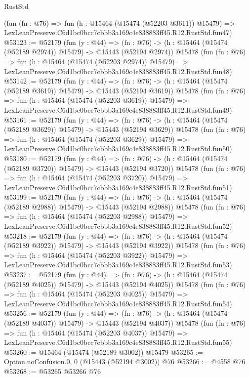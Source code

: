 \begin{lexlean}{RustStd}
\begin{coremodule}
    (fun (fn : @76) =>
    fun (h : @15464 (@15474 (@52203 @3611)) @15479) =>
    LexLeanPreserve.C6d1bc0bcc7cbbb3a169c4e838883ff45.R12.RustStd.fun47)
@53123 := @52179
    (fun (y : @44) =>
    (fn : @76) -> (h : @15464 (@15474 (@52189 @2974)) @15479) -> @15443 (@52194 @2974))
    @15478
    (fun (fn : @76) =>
    fun (h : @15464 (@15474 (@52203 @2974)) @15479) =>
    LexLeanPreserve.C6d1bc0bcc7cbbb3a169c4e838883ff45.R12.RustStd.fun48)
@53142 := @52179
    (fun (y : @44) =>
    (fn : @76) -> (h : @15464 (@15474 (@52189 @3619)) @15479) -> @15443 (@52194 @3619))
    @15478
    (fun (fn : @76) =>
    fun (h : @15464 (@15474 (@52203 @3619)) @15479) =>
    LexLeanPreserve.C6d1bc0bcc7cbbb3a169c4e838883ff45.R12.RustStd.fun49)
@53161 := @52179
    (fun (y : @44) =>
    (fn : @76) -> (h : @15464 (@15474 (@52189 @3629)) @15479) -> @15443 (@52194 @3629))
    @15478
    (fun (fn : @76) =>
    fun (h : @15464 (@15474 (@52203 @3629)) @15479) =>
    LexLeanPreserve.C6d1bc0bcc7cbbb3a169c4e838883ff45.R12.RustStd.fun50)
@53180 := @52179
    (fun (y : @44) =>
    (fn : @76) -> (h : @15464 (@15474 (@52189 @3720)) @15479) -> @15443 (@52194 @3720))
    @15478
    (fun (fn : @76) =>
    fun (h : @15464 (@15474 (@52203 @3720)) @15479) =>
    LexLeanPreserve.C6d1bc0bcc7cbbb3a169c4e838883ff45.R12.RustStd.fun51)
@53199 := @52179
    (fun (y : @44) =>
    (fn : @76) -> (h : @15464 (@15474 (@52189 @2988)) @15479) -> @15443 (@52194 @2988))
    @15478
    (fun (fn : @76) =>
    fun (h : @15464 (@15474 (@52203 @2988)) @15479) =>
    LexLeanPreserve.C6d1bc0bcc7cbbb3a169c4e838883ff45.R12.RustStd.fun52)
@53218 := @52179
    (fun (y : @44) =>
    (fn : @76) -> (h : @15464 (@15474 (@52189 @3922)) @15479) -> @15443 (@52194 @3922))
    @15478
    (fun (fn : @76) =>
    fun (h : @15464 (@15474 (@52203 @3922)) @15479) =>
    LexLeanPreserve.C6d1bc0bcc7cbbb3a169c4e838883ff45.R12.RustStd.fun53)
@53237 := @52179
    (fun (y : @44) =>
    (fn : @76) -> (h : @15464 (@15474 (@52189 @4025)) @15479) -> @15443 (@52194 @4025))
    @15478
    (fun (fn : @76) =>
    fun (h : @15464 (@15474 (@52203 @4025)) @15479) =>
    LexLeanPreserve.C6d1bc0bcc7cbbb3a169c4e838883ff45.R12.RustStd.fun54)
@53256 := @52179
    (fun (y : @44) =>
    (fn : @76) -> (h : @15464 (@15474 (@52189 @4037)) @15479) -> @15443 (@52194 @4037))
    @15478
    (fun (fn : @76) =>
    fun (h : @15464 (@15474 (@52203 @4037)) @15479) =>
    LexLeanPreserve.C6d1bc0bcc7cbbb3a169c4e838883ff45.R12.RustStd.fun55)
@53260 := @15464 (@15474 (@52189 @3002)) @15479
@53265 := Option.noConfusion.{0, 0} (@15443 (@52194 @3002)) @76
@53266 := @4558 @76
@53268 := @53265 @53266 @76

\end{coremodule}
\end{lexlean}
